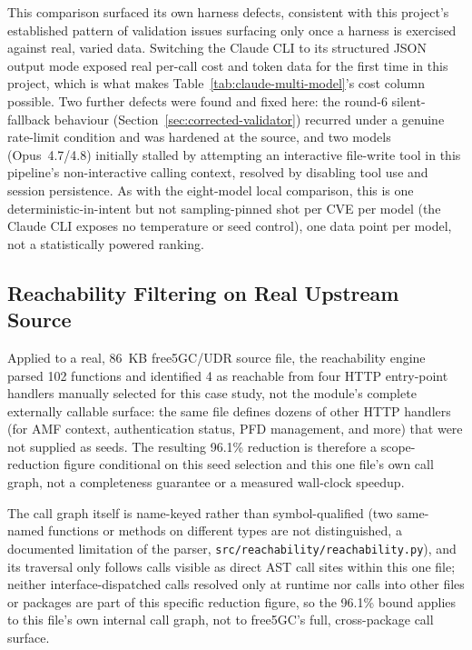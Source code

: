 \documentclass[12pt,a4paper]{report}
\begin{document}
This comparison surfaced its own harness defects, consistent with this project's established pattern of validation issues surfacing only once a harness is exercised against real, varied data. Switching the Claude CLI to its structured JSON output mode exposed real per-call cost and token data for the first time in this project, which is what makes Table~\ref{tab:claude-multi-model}'s cost column possible. Two further defects were found and fixed here: the round-6 silent-fallback behaviour (Section~\ref{sec:corrected-validator}) recurred under a genuine rate-limit condition and was hardened at the source, and two models (Opus~4.7/4.8) initially stalled by attempting an interactive file-write tool in this pipeline's non-interactive calling context, resolved by disabling tool use and session persistence. As with the eight-model local comparison, this is one deterministic-in-intent but not sampling-pinned shot per CVE per model (the Claude CLI exposes no temperature or seed control), one data point per model, not a statistically powered ranking.

\subsection{Reachability Filtering on Real Upstream Source}
\label{sec:reachability-filtering}

Applied to a real, 86~KB free5GC/UDR source file, the reachability engine parsed 102 functions and identified 4 as reachable from four HTTP entry-point handlers manually selected for this case study, not the module's complete externally callable surface: the same file defines dozens of other HTTP handlers (for AMF context, authentication status, PFD management, and more) that were not supplied as seeds. The resulting 96.1\% reduction is therefore a scope-reduction figure conditional on this seed selection and this one file's own call graph, not a completeness guarantee or a measured wall-clock speedup.

The call graph itself is name-keyed rather than symbol-qualified (two same-named functions or methods on different types are not distinguished, a documented limitation of the parser, \texttt{src/reachability/reachability.py}), and its traversal only follows calls visible as direct AST call sites within this one file; neither interface-dispatched calls resolved only at runtime nor calls into other files or packages are part of this specific reduction figure, so the 96.1\% bound applies to this file's own internal call graph, not to free5GC's full, cross-package call surface.
\end{document}

